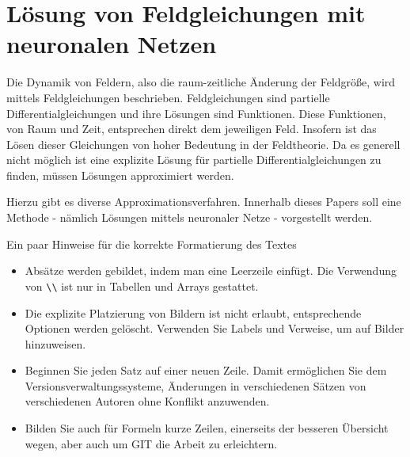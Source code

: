 %
%
%
%
\chapter{Lösung von Feldgleichungen mit neuronalen Netzen\label{chapter:neuronal}}
\begin{refsection}

Die Dynamik von Feldern, also die raum-zeitliche Änderung der Feldgröße, wird mittels Feldgleichungen beschrieben.
Feldgleichungen sind partielle Differentialgleichungen und ihre Lösungen sind Funktionen.
Diese Funktionen, von Raum und Zeit, entsprechen direkt dem jeweiligen Feld.
Insofern ist das Lösen dieser Gleichungen von hoher Bedeutung in der Feldtheorie.
Da es generell nicht möglich ist eine explizite Lösung für partielle Differentialgleichungen zu finden, müssen Lösungen approximiert werden.

Hierzu gibt es diverse Approximationsverfahren.
Innerhalb dieses Papers soll eine Methode - nämlich Lösungen mittels neuronaler Netze - vorgestellt werden.\newline


Ein paar Hinweise für die korrekte Formatierung des Textes
\begin{itemize}
\item
Absätze werden gebildet, indem man eine Leerzeile einfügt.
Die Verwendung von \verb+\\+ ist nur in Tabellen und Arrays gestattet.
\item
Die explizite Platzierung von Bildern ist nicht erlaubt, entsprechende
Optionen werden gelöscht. 
Verwenden Sie Labels und Verweise, um auf Bilder hinzuweisen.
\item
Beginnen Sie jeden Satz auf einer neuen Zeile. 
Damit ermöglichen Sie dem Versionsverwaltungssysteme, Änderungen
in verschiedenen Sätzen von verschiedenen Autoren ohne Konflikt 
anzuwenden.
\item 
Bilden Sie auch für Formeln kurze Zeilen, einerseits der besseren
Übersicht wegen, aber auch um GIT die Arbeit zu erleichtern.
\end{itemize}











\printbibliography[heading=subbibliography]
\end{refsection}
